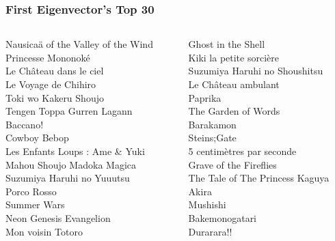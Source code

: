 \documentclass[handout]{beamer}
\begin{document}
\begin{frame}
    \frametitle{First Eigenvector's Top 30}
    \begin{columns}
    \begin{column}{0.5\textwidth}
  Nausicaä of the Valley of the Wind\\
                  Princesse Mononoké\\
             Le Château dans le ciel\\
                Le Voyage de Chihiro\\
               Toki wo Kakeru Shoujo\\
          Tengen Toppa Gurren Lagann\\
                            Baccano!\\
                        Cowboy Bebop\\
     Les Enfants Loups : Ame \& Yuki\\
          Mahou Shoujo Madoka Magica\\
          Suzumiya Haruhi no Yuuutsu\\
                         Porco Rosso\\
                         Summer Wars\\
             Neon Genesis Evangelion\\
                   Mon voisin Totoro\\
    \end{column}
    \begin{column}{0.5\textwidth}
                  Ghost in the Shell\\
             Kiki la petite sorcière\\
       Suzumiya Haruhi no Shoushitsu\\
                 Le Château ambulant\\
                             Paprika\\
                 The Garden of Words\\
                           Barakamon\\
                         Steins\string;Gate\\
           5 centimètres par seconde\\
              Grave of the Fireflies\\
     The Tale of The Princess Kaguya\\
                               Akira\\
                            Mushishi\\
                      Bakemonogatari\\
                          Durarara!!
    \end{column}
    \end{columns}
\end{frame}
\end{document}

